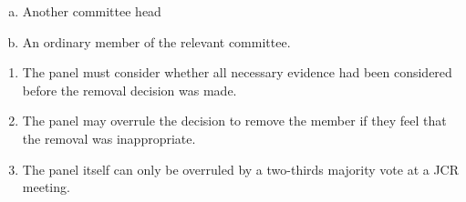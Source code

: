 \documentclass[12pt]{article}  %
\begin{document}
\begin{enumerate}
\begin{enumerate}[(a)]
        \item Another committee head
        \item An ordinary member of the relevant committee.
    \end{enumerate}
    \begin{enumerate}
        \item The panel must consider whether all necessary evidence had been considered before the removal decision was made.
        \item The panel may overrule the decision to remove the member if they feel that the removal was inappropriate.
        \item The panel itself can only be overruled by a two-thirds majority vote at a JCR meeting.
    \end{enumerate}
\end{enumerate}
\newpage
\end{document}
